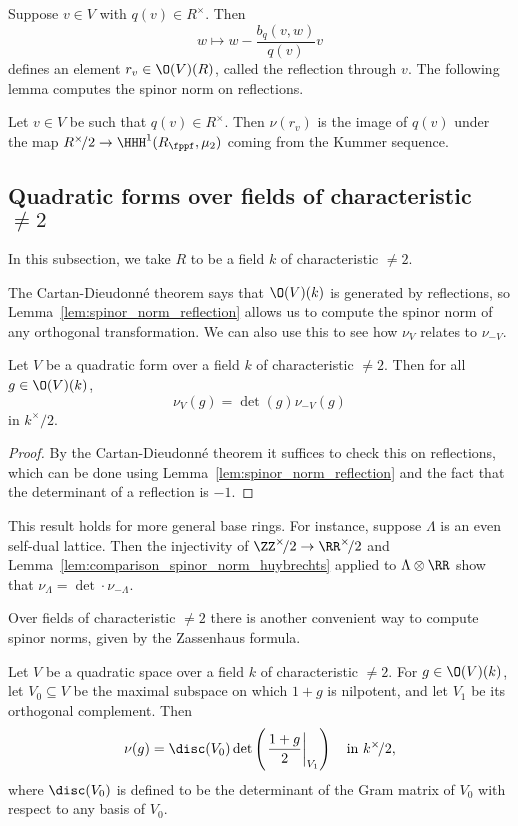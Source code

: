 Suppose $v \in V$ with $q(v) \in R^{\times}$. Then
$$
w \longmapsto w - \frac{b_q(v,w)}{q(v)}v
$$
defines an element $r_v \in \O(V)(R)$, called the reflection through $v$. The following lemma computes the spinor norm on reflections.
\begin{lemma}\label{lem:spinor_norm_reflection}
    Let $v \in V$ be such that $q(v) \in R^{\times}$. Then $\nu(r_v)$ is the image of $q(v)$ under the map $R^{\times}\!/2 \rightarrow \HHH^1(R_{\fppf},\mu_2)$ coming from the Kummer sequence.
\end{lemma}

\subsection{Quadratic forms over fields of characteristic $\neq 2$}
In this subsection, we take $R$ to be a field $k$ of characteristic $\neq 2$.

The Cartan-Dieudonn\'e theorem says that $\O(V)(k)$ is generated by reflections, so Lemma~\ref{lem:spinor_norm_reflection} allows us to compute the spinor norm of any orthogonal transformation. We can also use this to see how $\nu_V$ relates to $\nu_{-V}$.

\begin{lemma}\label{lem:comparison_spinor_norm_huybrechts}
Let $V$ be a quadratic form over a field $k$ of characteristic $\neq 2$. Then for all $g \in \O(V)(k)$,
$$
\nu_V(g) = \det(g) \nu_{-V}(g)
$$
in $k^{\times}\!/2$.
\end{lemma}
\begin{proof}
By the Cartan-Dieudonn\'e theorem it suffices to check this on reflections, which can be done using Lemma~\ref{lem:spinor_norm_reflection} and the fact that the determinant of a reflection is $-1$.
\end{proof}

\begin{remark}\label{rk:comparison_spinor_norm_Huybrechts}
This result holds for more general base rings. For instance, suppose $\Lambda$ is an even self-dual lattice. Then the injectivity of $\ZZ^{\times}\!/2 \rightarrow \RR^{\times}\!/2$ and Lemma~\ref{lem:comparison_spinor_norm_huybrechts} applied to $\Lambda \otimes \RR$ show that $\nu_{\Lambda} = \det \cdot \nu_{- \Lambda}$.
\end{remark}

Over fields of characteristic $\neq 2$ there is another convenient way to compute spinor norms, given by the Zassenhaus formula.
\begin{lemma}\label{lem:zassenhaus}
    Let $V$ be a quadratic space over a field $k$ of characteristic $\neq 2$. For $g \in \O(V)(k)$, let $V_0 \subseteq V$ be the maximal subspace on which $1 + g$ is nilpotent, and let $V_1$ be its orthogonal complement. Then
$$
    \nu(g) = \disc(V_0) \det\left(\left.\frac{1 + g}{2}\right|_{V_1}\right) \ \ \textnormal{ in } k^{\times}\!/2,
$$
where $\disc(V_0)$ is defined to be the determinant of the Gram matrix of $V_0$ with respect to any basis of $V_0$.
\end{lemma}

